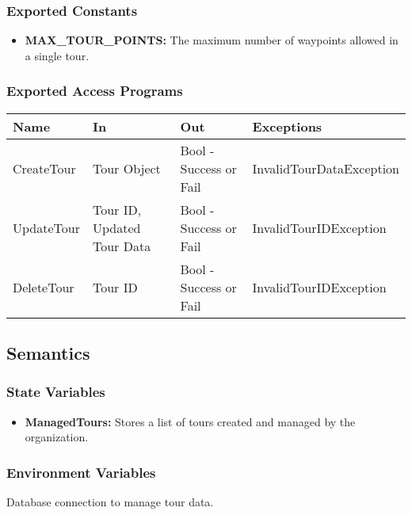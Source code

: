 \documentclass[12pt, titlepage]{article}
\begin{document}
\subsubsection{Exported Constants}

\begin{itemize}
    \item \textbf{MAX\_TOUR\_POINTS:} The maximum number of waypoints allowed in a single tour.
\end{itemize}

\subsubsection{Exported Access Programs}

\begin{center}
\begin{tabular}{p{2.5cm} p{4cm} p{4cm} p{5cm}}
\hline
\textbf{Name} & \textbf{In} & \textbf{Out} & \textbf{Exceptions} \\
\hline
CreateTour & Tour Object & Bool - Success or Fail & InvalidTourDataException \\
\hline
UpdateTour & Tour ID, Updated Tour Data & Bool - Success or Fail & InvalidTourIDException \\
\hline
DeleteTour & Tour ID & Bool - Success or Fail & InvalidTourIDException \\
\hline
\end{tabular}
\end{center}

\subsection{Semantics}

\subsubsection{State Variables}

\begin{itemize}
    \item \textbf{ManagedTours:} Stores a list of tours created and managed by the organization.
\end{itemize}

\subsubsection{Environment Variables}

Database connection to manage tour data.
\end{document}
